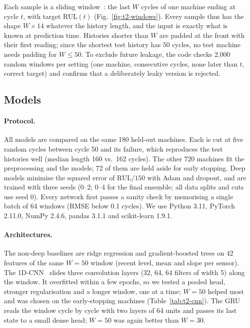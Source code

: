 Each sample is a sliding window~\cite{babu2016,zheng2017,li2018}: the last $W$ cycles of one machine
ending at cycle $t$, with target $\mathrm{RUL}(t)$ (Fig.~\ref{fig:t2-windows}). Every sample thus has
the shape $W \times 14$ whatever the history length, and the input is exactly what is known at
prediction time. Histories shorter than $W$ are padded at the front with their first reading; since
the shortest test history has 50 cycles, no test machine needs padding for $W \le 50$. To exclude
future leakage, the code checks 2{,}000 random windows per setting (one machine, consecutive cycles,
none later than $t$, correct target) and confirms that a deliberately leaky version is rejected.

\subsection{Models}
\label{sec:t2-models}

\paragraph{Protocol.} All models are compared on the same 180 held-out machines. Each is cut at five
random cycles between cycle 50 and its failure, which reproduces the test histories well (median
length 160 vs.\ 162 cycles). The other 720 machines fit the preprocessing and the models; 72 of them
are held aside for early stopping. Deep models minimise the squared error of $\mathrm{RUL}/150$ with
Adam and dropout, and are trained with three seeds (0--2; 0--4 for the final ensemble; all data
splits and cuts use seed 0). Every network
first passes a sanity check by memorising a single batch of 64 windows (RMSE below 0.1 cycles). We use
Python 3.11, PyTorch 2.11.0, NumPy 2.4.6, pandas 3.1.1 and scikit-learn 1.9.1.

\paragraph{Architectures.} The non-deep baselines are ridge regression and gradient-boosted trees on
42 features of the same $W=50$ window (recent level, mean and slope per sensor). The 1D-CNN~\cite{babu2016,li2018} slides
three convolution layers (32, 64, 64 filters of width 5) along the window. It overfitted within a few
epochs, so we tested a pooled head, stronger regularisation and a longer window, one at a time;
$W=50$ helped most and was chosen on the early-stopping machines (Table~\ref{tab:t2-cnn}). The
GRU~\cite{cho2014} reads the window cycle by cycle with two layers of 64 units and passes its last
state to a small dense head; $W=50$ was again better than $W=30$.

